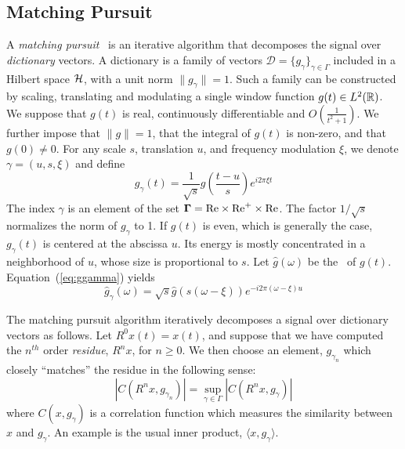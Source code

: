 \subsection{Matching Pursuit}
\label{sec:MP}
A \emph{matching pursuit}~\cite{Mallat:1993} is an iterative algorithm
that decomposes the signal over \emph{dictionary} vectors.
A dictionary is a family of vectors 
$\mathcal{D}= \{g_\gamma\}_{\gamma\in\Gamma}$ 
included in a Hilbert space $\mathcal{H}$, with a unit norm
$\|g_\gamma\|=1$.  Such a family can be constructed by scaling,
translating and modulating a single window function $g(t) \in L^2(\mathbb{R})$.
We suppose that $g(t)$ is real, continuously differentiable and
$O(\frac{1}{t^2+1})$.  We further impose that $\|g\|=1$, that the
integral of $g(t)$ is non-zero, and that $g(0)\neq 0$.  
For any scale $s$, translation $u$, and frequency modulation $\xi$, we
denote $\gamma = (u,s,\xi)$ and define
\begin{equation}\label{eq:ggamma}
g_\gamma(t) 
= \frac{1}{\sqrt{s}}g\left(\frac{t-u}{s}\right) e^{i2\pi\xi t}
\end{equation}
The index $\gamma$ is an element of the set 
$\mathbf{\Gamma} = \mbox{Re} \times \mbox{Re}^+ \times \mbox{Re}$.  The factor
$1/\sqrt{s}$ normalizes the norm of $g_\gamma$ to 1. If $g(t)$ is
even, which is generally the case, $g_\gamma(t)$ is centered at the
abscissa $u$.  Its energy is mostly concentrated in a neighborhood of
$u$, whose size is proportional to $s$.  Let $\hat{g}(\omega)$ be the
\FT\ of $g(t)$.  Equation~(\ref{eq:ggamma}) yields
\[
\hat{g}_\gamma(\omega) 
= \sqrt{s}\hat{g}(s(\omega - \xi))e^{-i2\pi(\omega-\xi)u}
\]

The matching pursuit algorithm iteratively decomposes a signal over
dictionary vectors as follows.
Let $R^0x(t)=x(t)$, and suppose that we have computed the $n^{th}$
order \emph{residue}, $R^nx$, for $n\geq 0$.  We then choose an
element, $g_{\gamma_n}$ which closely ``matches'' the residue in the
following sense:
\[
|C(R^nx,g_{\gamma_n})| = \sup_{\gamma \in \Gamma} |C(R^nx,g_\gamma)|
\]
where $C(x,g_\gamma)$ is a correlation function which measures the
similarity between $x$ and $g_\gamma$.  An example is the usual inner
product, $\langle x,g_\gamma \rangle$.

